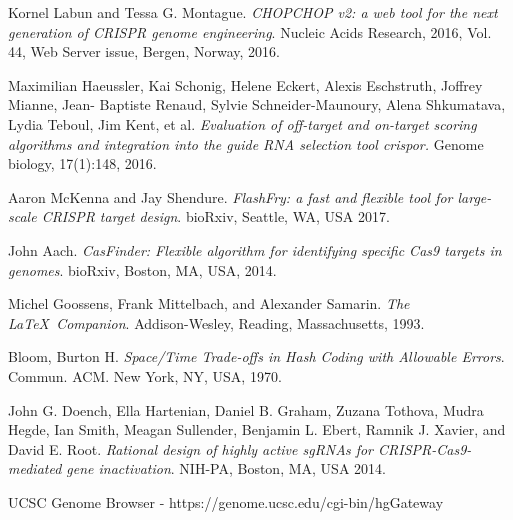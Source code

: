 \documentclass[12pt]{article}
\begin{document}
\begin{thebibliography}{9}
    Kornel Labun and Tessa G. Montague.
    \textit{CHOPCHOP v2: a web tool for the next generation of CRISPR genome engineering}.
    Nucleic Acids Research, 2016, Vol. 44, Web Server issue, Bergen, Norway, 2016.

    Maximilian Haeussler, Kai Schonig, Helene Eckert, Alexis Eschstruth, Joffrey Mianne, Jean-
Baptiste Renaud, Sylvie Schneider-Maunoury, Alena Shkumatava, Lydia Teboul, Jim Kent,
et al.
    \textit{Evaluation of off-target and on-target scoring algorithms and integration into the guide RNA selection tool crispor.}
    Genome biology, 17(1):148, 2016.

    Aaron McKenna and Jay Shendure.
    \textit{FlashFry: a fast and flexible tool for large-scale CRISPR target design}.
    bioRxiv, Seattle, WA, USA 2017.

    John Aach.
    \textit{CasFinder: Flexible algorithm for identifying specific Cas9 targets in genomes}.
    bioRxiv, Boston, MA, USA, 2014.

    Michel Goossens, Frank Mittelbach, and Alexander Samarin.
    \textit{The \LaTeX\ Companion}.
    Addison-Wesley, Reading, Massachusetts, 1993.

    Bloom, Burton H.
    \textit{Space/Time Trade-offs in Hash Coding with Allowable Errors}.
    Commun. ACM. New York, NY, USA, 1970.

    John G. Doench, Ella Hartenian, Daniel B. Graham, Zuzana Tothova, Mudra Hegde, Ian Smith, Meagan Sullender, Benjamin L. Ebert, Ramnik J. Xavier, and David E. Root.
    \textit{Rational design of highly active sgRNAs for CRISPR-Cas9-mediated gene inactivation}.
    NIH-PA, Boston, MA, USA 2014.

    UCSC Genome Browser - https://genome.ucsc.edu/cgi-bin/hgGateway

    \end{thebibliography}
\end{document}
